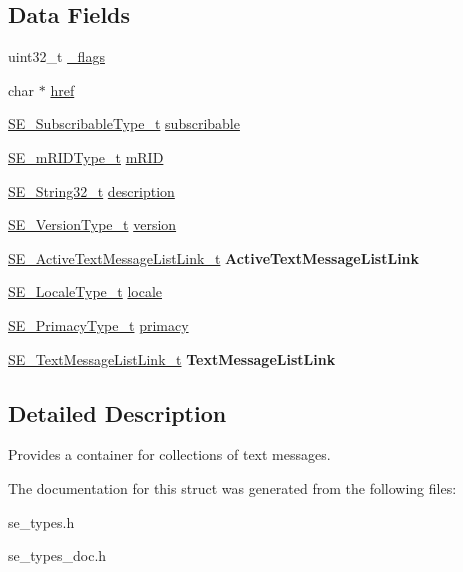 \subsection*{Data Fields}
\begin{DoxyCompactItemize}
\item 
uint32\+\_\+t \hyperlink{group__MessagingProgram_ga42f850441cf2c04e986da12014095d29}{\+\_\+flags}
\item 
char $\ast$ \hyperlink{group__MessagingProgram_ga1eb751e532e2b3d1a8ddabe4a2d010f8}{href}
\item 
\hyperlink{group__SubscribableType_ga5c41f553d369710ed34619266bf2551e}{S\+E\+\_\+\+Subscribable\+Type\+\_\+t} \hyperlink{group__MessagingProgram_ga00670f1887e83efd074cb1c3431b1723}{subscribable}
\item 
\hyperlink{group__mRIDType_gac74622112f3a388a2851b2289963ba5e}{S\+E\+\_\+m\+R\+I\+D\+Type\+\_\+t} \hyperlink{group__MessagingProgram_ga76dee6cf9af1a2113b116d4eb87805bb}{m\+R\+ID}
\item 
\hyperlink{group__String32_gac9f59b06b168b4d2e0d45ed41699af42}{S\+E\+\_\+\+String32\+\_\+t} \hyperlink{group__MessagingProgram_gaac179189b467239471e30bb4fc54ed82}{description}
\item 
\hyperlink{group__VersionType_ga4b8d27838226948397ed99f67d46e2ae}{S\+E\+\_\+\+Version\+Type\+\_\+t} \hyperlink{group__MessagingProgram_ga63c952695fdbc82efa3253c42745a7f8}{version}
\item 
\hyperlink{structSE__ActiveTextMessageListLink__t}{S\+E\+\_\+\+Active\+Text\+Message\+List\+Link\+\_\+t} {\bfseries Active\+Text\+Message\+List\+Link}
\item 
\hyperlink{group__LocaleType_gafbd2b639ff2cebd36ad75759203ee20c}{S\+E\+\_\+\+Locale\+Type\+\_\+t} \hyperlink{group__MessagingProgram_ga57da8d224c245d4abf36172470de4c00}{locale}
\item 
\hyperlink{group__PrimacyType_ga484b22ef8ff92c8801e6a8b7bd8351eb}{S\+E\+\_\+\+Primacy\+Type\+\_\+t} \hyperlink{group__MessagingProgram_ga5923a2dd14be22f05ec8b33c73a4676e}{primacy}
\item 
\hyperlink{structSE__TextMessageListLink__t}{S\+E\+\_\+\+Text\+Message\+List\+Link\+\_\+t} {\bfseries Text\+Message\+List\+Link}
\end{DoxyCompactItemize}


\subsection{Detailed Description}
Provides a container for collections of text messages. 

The documentation for this struct was generated from the following files\+:\begin{DoxyCompactItemize}
\item 
se\+\_\+types.\+h\item 
se\+\_\+types\+\_\+doc.\+h\end{DoxyCompactItemize}
